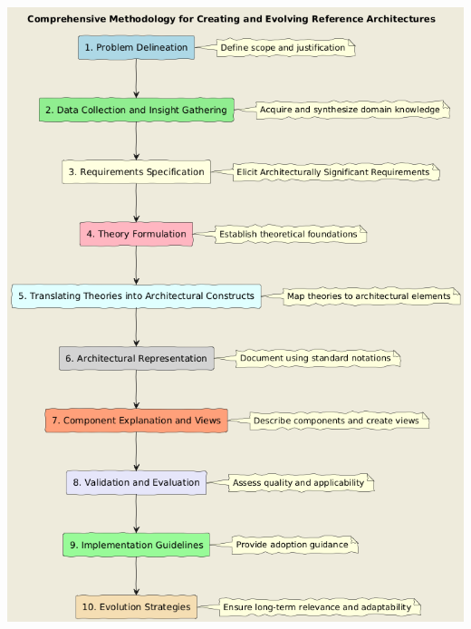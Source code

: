 \documentclass[12pt,a4paper]{article}
\begin{document}
\includegraphics[width=\textwidth]{assets/methodologyPhases.png}
\end{document}
